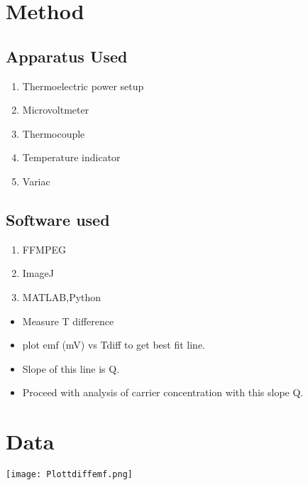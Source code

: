 \documentclass{article}
\begin{document}
\section{Method}

\subsection*{Apparatus Used}
\begin{enumerate}
    \item Thermoelectric power setup
    \item Microvoltmeter
    \item Thermocouple
    \item Temperature indicator
    \item Variac
\end{enumerate}

\subsection*{Software used}
\begin{enumerate}
    \item FFMPEG
    \item ImageJ
    \item MATLAB,Python
\end{enumerate}

\begin{itemize}
    \item Measure T difference
    \item plot emf (mV) vs Tdiff to get best fit line.
    \item Slope of this line is Q.
    \item Proceed with analysis of carrier concentration with this slope Q.
\end{itemize}

\section{Data}

\texttt{[image: Plottdiffemf.png]}
\end{document}
